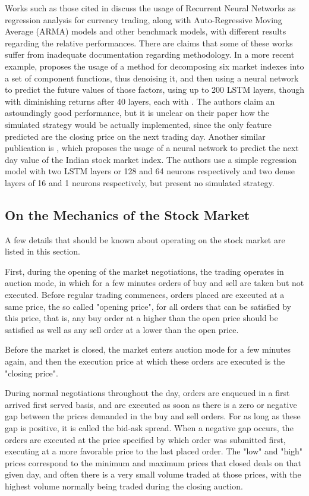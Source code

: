 \documentclass[conference]{IEEEtran}
\begin{document}
Works such as those cited in \cite{dunis2004applied} discuss the usage of Recurrent Neural Networks as regression analysis for currency trading, along with Auto-Regressive Moving Average (ARMA) models and other benchmark models, with different results regarding the relative performances. There are claims that some of these works suffer from inadequate documentation regarding methodology. In a more recent example, \cite{ZHANG2020113609} proposes the usage of a method for decomposing six market indexes into a set of component functions, thus denoising it, and then using a neural network to predict the future values of those factors, using up to 200 LSTM layers, though with diminishing returns after 40 layers, each with . The authors claim an astoundingly good performance, but it is unclear on their paper how the simulated strategy would be actually implemented, since the only feature predicted are the closing price on the next trading day. Another similar publication is \cite{roondiwala2017predicting}, which proposes the usage of a neural network to predict the next day value of the Indian stock market index. The authors use a simple regression model with two LSTM layers or 128 and 64 neurons respectively and two dense layers of 16 and 1 neurons respectively, but present no simulated strategy.

\subsection{On the Mechanics of the Stock Market}

A few details that should be known about operating on the stock market are listed in this section.

First, during the opening of the market negotiations, the trading operates in auction mode, in which for a few minutes orders of buy and sell are taken but not executed. Before regular trading commences, orders placed are executed at a same price, the so called "opening price", for all orders that can be satisfied by this price, that is, any buy order at a higher than the open price should be satisfied as well as any sell order at a lower than the open price.

Before the market is closed, the market enters auction mode for a few minutes again, and then the execution price at which these orders are executed is the "closing price".

During normal negotiations throughout the day, orders are enqueued in a first arrived first served basis, and are executed as soon as there is a zero or negative gap between the prices demanded in the buy and sell orders. For as long as these gap is positive, it is called the bid-ask spread. When a negative gap occurs, the orders are executed at the price specified by which order was submitted first, executing at a more favorable price to the last placed order. The "low" and "high" prices correspond to the minimum and maximum prices that closed deals on that given day, and often there is a very small volume traded at those prices, with the highest volume normally being traded during the closing auction. 
\end{document}
